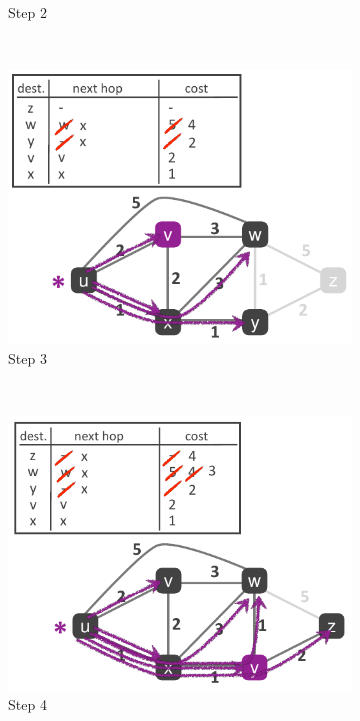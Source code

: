 \documentclass[12pt,a4paper]{article}
\begin{document}
\begin{figure}[h]
\begin{subfigure}[t]{0.3\textwidth}
		\caption{Step 2}
		\label{subf: step2}
	\end{subfigure}
	~
	\begin{subfigure}[t]{0.3\textwidth}
		\centering
		\includegraphics[scale=0.4]{images/dijkstra3}
		\caption{Step 3}
		\label{subf: step3}
	\end{subfigure}
	~\\
	\begin{subfigure}[b]{0.3\textwidth}
		\centering
		\includegraphics[scale=0.4]{images/dijkstra4}
		\caption{Step 4}
		\label{subf: step4}
	\end{subfigure}
	~
	\begin{subfigure}[b]{0.3\textwidth}

\end{subfigure}
\end{figure}
\end{document}

